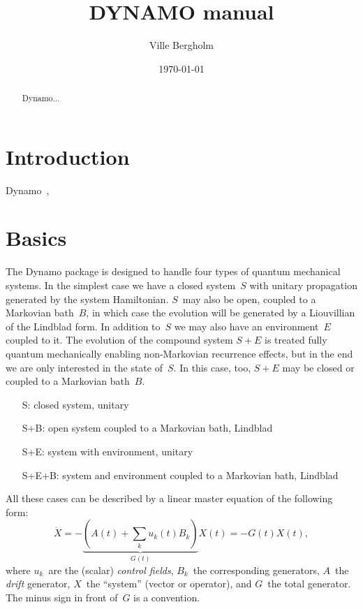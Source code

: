\documentclass[aps, pra, a4paper, longbibliography]{revtex4}
\newcommand{\be}{\begin{equation}}
\newcommand{\ee}{\end{equation}}
\begin{document}
\title{DYNAMO manual}
\date{\today}

\author{Ville Bergholm}


\begin{abstract}
Dynamo...
\end{abstract}
\maketitle



\tableofcontents


\section{Introduction}

Dynamo~\cite{machnes_2011},



\section{Basics}
The Dynamo package is designed to handle four types of quantum
mechanical systems.
In the simplest case we have a closed system~$S$ with unitary
propagation generated by the system Hamiltonian.
$S$~may also be open, coupled to a Markovian bath~$B$, in which
case the evolution will be generated by a Liouvillian of the Lindblad form.
In addition to~$S$ we may also have an environment~$E$ coupled to
it. The evolution of the compound system $S+E$ is treated
fully quantum mechanically enabling non-Markovian recurrence effects,
but in the end we are only interested in the state of~$S$. In this
case, too, $S+E$ may be closed or coupled to a Markovian bath~$B$.
\begin{itemize}
\item[S:] closed system, unitary
\item[S+B:] open system coupled to a Markovian bath, Lindblad
\item[S+E:] system with environment, unitary
\item[S+E+B:] system and environment coupled to a Markovian bath, Lindblad
\end{itemize}

All these cases can be described by a linear master equation of the following form:
\be
\label{eq:master}
\dot{X} = -\underbrace{(A(t) +\sum_k u_k(t) B_k)}_{G(t)} X(t) = -G(t) X(t),
\ee
where $u_k$~are the (scalar) \emph{control fields}, $B_k$~the corresponding generators,
$A$~the \emph{drift} generator, $X$~the ``system'' (vector or operator), and $G$~the total generator.
The minus sign in front of~$G$ is a convention.
\end{document}
